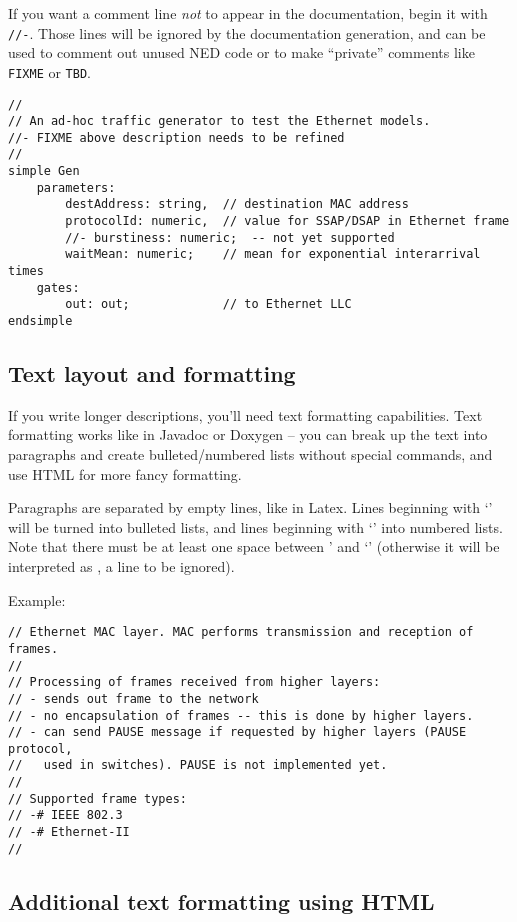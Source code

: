 If you want a comment line \textit{not} to appear in the documentation,
begin it with \texttt{//-}. Those lines will be ignored by the
documentation generation, and can be used to comment out
unused NED code or to make ``private'' comments like \texttt{FIXME} or
\texttt{TBD}.

\begin{verbatim}
//
// An ad-hoc traffic generator to test the Ethernet models.
//- FIXME above description needs to be refined
//
simple Gen
    parameters:
        destAddress: string,  // destination MAC address
        protocolId: numeric,  // value for SSAP/DSAP in Ethernet frame
        //- burstiness: numeric;  -- not yet supported
        waitMean: numeric;    // mean for exponential interarrival times
    gates:
        out: out;             // to Ethernet LLC
endsimple
\end{verbatim}


\subsection{Text layout and formatting}

If you write longer descriptions, you'll need text formatting capabilities.
Text formatting works like in Javadoc or Doxygen -- you can break up the
text into paragraphs and create bulleted/numbered lists without
special commands, and use HTML for more fancy formatting.

Paragraphs are separated by empty lines, like in Latex. Lines beginning with `\ttt{-}'
will be turned into bulleted lists, and lines beginning with
`\ttt{-#}' into numbered lists. Note that there must be at least one space
between '\ttt{//} and `\ttt{-}' (otherwise it will be interpreted as \ttt{//-},
a line to be ignored).

Example:

\begin{verbatim}
// Ethernet MAC layer. MAC performs transmission and reception of frames.
//
// Processing of frames received from higher layers:
// - sends out frame to the network
// - no encapsulation of frames -- this is done by higher layers.
// - can send PAUSE message if requested by higher layers (PAUSE protocol,
//   used in switches). PAUSE is not implemented yet.
//
// Supported frame types:
// -# IEEE 802.3
// -# Ethernet-II
//
\end{verbatim}

\subsection{Additional text formatting using HTML}

